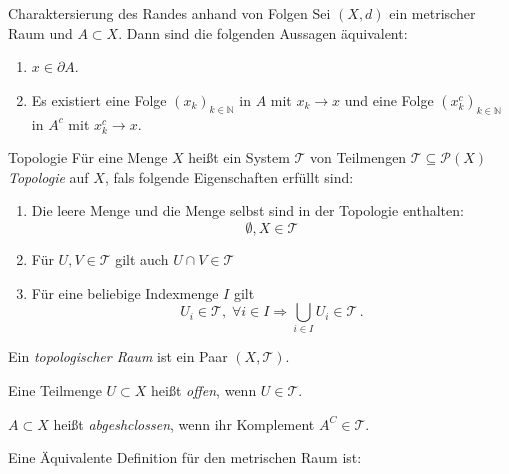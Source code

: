 \begin{satz}{Charaktersierung des Randes anhand von Folgen}
    Sei $(X,d)$ ein metrischer Raum und $A\subset X$. Dann sind die folgenden Aussagen äquivalent:

    \begin{enumerate}%
        \item $x\in\partial A$.
        \item Es existiert eine Folge $(x_k)_{k\in\mathbb{N}}$ in $A$ mit $x_k\to x$ und eine Folge $(x_k^{c})_{k\in\mathbb{N}}$ in $A^{c}$ mit $x_k^{c}\to x$.
    \end{enumerate}   
\end{satz}

\begin{definition}{Topologie}
    Für eine Menge $X$ heißt ein System $\mathcal{T}$ von Teilmengen $\mathcal{T} \subseteq \mathcal{P}(X)$ \emph{Topologie} auf $X$, fals folgende Eigenschaften erfüllt sind:
    \begin{enumerate}
        \item Die leere Menge und die Menge selbst sind in der Topologie enthalten:
        $$
            \emptyset, X \in \mathcal{T}
        $$

        \item Für $U,V \in \mathcal{T}$ gilt auch $U \cap V \in \mathcal{T}$

        \item Für eine beliebige Indexmenge $I$ gilt
        $$
            U_i \in \mathcal{T}, \; \forall i \in I \Rightarrow \bigcup_ {i\in I} U_i \in \mathcal{T} \, .
        $$
    \end{enumerate}
    
    Ein \emph{topologischer Raum} ist ein Paar $(X, \mathcal{T})$.

    Eine Teilmenge $U \subset X$ heißt \emph{offen}, wenn $U \in \mathcal{T}$.

    $A \subset X$ heißt \emph{abgeshclossen}, wenn ihr Komplement $A^C \in \mathcal{T}$.
\end{definition}

Eine Äquivalente Definition für den metrischen Raum ist:


